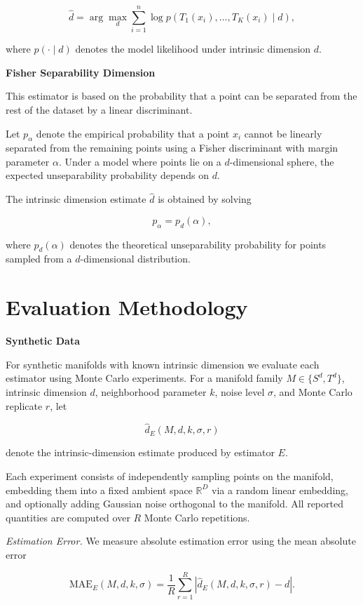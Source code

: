 \documentclass[11pt]{article}
\begin{document}
\[
\hat d =
\arg\max_d
\sum_{i=1}^n
\log p\!\left(
T_1(x_i),\dots,T_K(x_i) \mid d
\right),
\]

where $p(\cdot \mid d)$ denotes the model likelihood under intrinsic dimension $d$.

\textbf{Fisher Separability Dimension} \cite{gorban2019}

This estimator is based on the probability that a point can be separated from the rest of the dataset by a linear discriminant.

Let $p_\alpha$ denote the empirical probability that a point $x_i$ cannot be linearly separated from the remaining points using a Fisher discriminant with margin parameter $\alpha$. 
Under a model where points lie on a $d$-dimensional sphere, the expected unseparability probability depends on $d$.

The intrinsic dimension estimate $\hat d$ is obtained by solving

\[
p_\alpha = p_d(\alpha),
\]

where $p_d(\alpha)$ denotes the theoretical unseparability probability for points sampled from a $d$-dimensional distribution.

\section*{Evaluation Methodology}

\textbf{Synthetic Data}

For synthetic manifolds with known intrinsic dimension we evaluate each estimator using Monte Carlo experiments. 
For a manifold family $M \in \{S^d, T^d\}$, intrinsic dimension $d$, neighborhood parameter $k$, noise level $\sigma$, and Monte Carlo replicate $r$, let

\[
\hat d_{E}(M,d,k,\sigma,r)
\]

denote the intrinsic-dimension estimate produced by estimator $E$.

Each experiment consists of independently sampling points on the manifold, embedding them into a fixed ambient space $\mathbb{R}^D$ via a random linear embedding, and optionally adding Gaussian noise orthogonal to the manifold. 
All reported quantities are computed over $R$ Monte Carlo repetitions.

\emph{Estimation Error.}  
We measure absolute estimation error using the mean absolute error

\[
\mathrm{MAE}_E(M,d,k,\sigma)
=
\frac{1}{R}
\sum_{r=1}^{R}
\left|
\hat d_{E}(M,d,k,\sigma,r)-d
\right|.
\]
\end{document}
